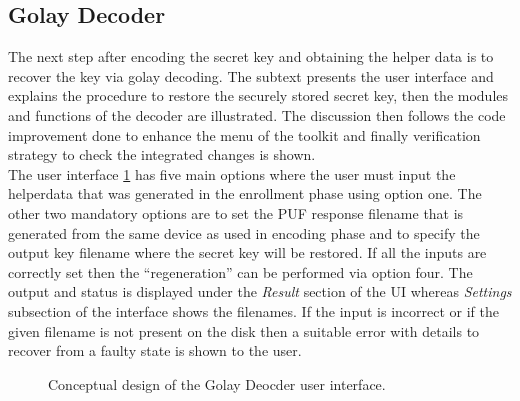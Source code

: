 \subsection{Golay Decoder}
The next step after encoding the secret key and obtaining the helper data is to recover the key via golay decoding. The subtext presents the user interface and explains the procedure to restore the securely stored secret key, then the modules and functions of the decoder are illustrated. The discussion then follows the code improvement done to enhance the menu of the toolkit and finally verification strategy to check the integrated changes is shown.\\

The user interface \ref{img:golay_decoder_ui} has five main options where the user must input the helperdata that was generated in the enrollment phase using option one. The other two mandatory options are to set the PUF response filename that is generated from the same device as used in encoding phase and to specify the output key filename where the secret key will be restored. If all the inputs are correctly set then the ``regeneration'' can be performed via option four. The output and status is displayed
under the \emph{Result} section of the UI whereas \emph{Settings} subsection of the interface shows the filenames. If the input is incorrect or if the given filename is not present on the disk then a suitable error with details to recover from a faulty state is shown to the user.\\
\begin{figure}
\centering
{}
\caption{Conceptual design of the Golay Deocder user interface.}
\label{img:golay_decoder_ui}
\end{figure}

